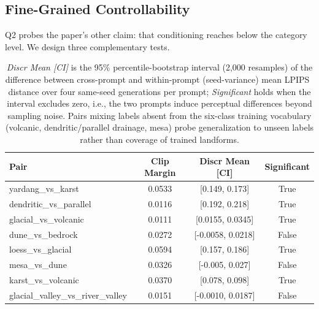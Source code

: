 \documentclass[review]{vgtc}                 %
\begin{document}
\subsection{Fine-Grained Controllability}
\label{sec:controllability}

Q2 probes the paper's other claim: that conditioning reaches below the category level.
We design three complementary tests.

\begin{table}[t]
    \small
    \centering
    
    
    \begin{tabular}{lccc} 
        \toprule
        \textbf{Pair} & \textbf{Clip Margin} & \textbf{Discr Mean [CI]} & \textbf{Significant} \\
        \midrule
        yardang\_vs\_karst & 0.0533 & [0.149, 0.173] & True \\
        dendritic\_vs\_parallel & 0.0116 & [0.192, 0.218] & True \\
        glacial\_vs\_volcanic & 0.0111 & [0.0155, 0.0345] & True \\
        dune\_vs\_bedrock & 0.0272 & [-0.0058, 0.0218] & False \\
        loess\_vs\_glacial & 0.0594 & [0.157, 0.186] & True \\
        mesa\_vs\_dune & 0.0326 & [-0.005, 0.027] & False \\
        karst\_vs\_volcanic & 0.0370 & [0.078, 0.098] & True \\
        glacial\_valley\_vs\_river\_valley & 0.0151 & [-0.0010, 0.0187] & False \\
        \bottomrule
    \end{tabular}
    \caption{\emph{Discr Mean [CI]} is the 95\% percentile-bootstrap interval (2{,}000 resamples)
    of the difference between cross-prompt and within-prompt (seed-variance) mean LPIPS~\cite{LPIPS}
    distance over four same-seed generations per prompt; \emph{Significant} holds when the
    interval excludes zero, i.e., the two prompts induce perceptual differences beyond
    sampling noise. Pairs mixing labels absent from the six-class training vocabulary (volcanic, dendritic/parallel drainage, mesa) probe generalization to unseen labels rather than coverage of trained landforms.}
    \label{tab:category_discriminability}
\end{table}
\end{document}

